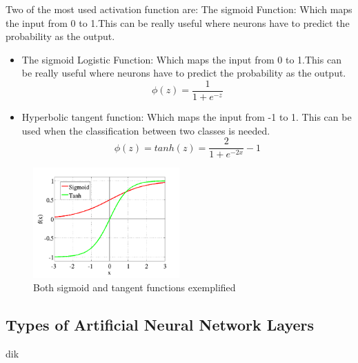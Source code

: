 Two of the most used activation function are:
The sigmoid Function: Which maps the input from 0 to 1.This can be really useful where neurons have to predict the probability as the output.

\begin{itemize}
\item The sigmoid Logistic Function: Which maps the input from 0 to 1.This can be really useful where neurons have to predict the probability as the output.
\begin{equation}
 \phi(z) = \frac{1}{1+e^{-z}}
\end{equation}

\item Hyperbolic tangent function: Which maps the input from -1 to 1. This can be used when the classification between two classes is needed.
\begin{equation}
 \phi(z) = tanh(z)= \frac{2}{1+e^{-2x}}-1
\end{equation}

\end{itemize}

\begin{figure}[htp]
	\centering
	\includegraphics[width=0.5\textwidth]{Illustrations/sigmoidandtangent.jpeg}
	\caption{Both sigmoid and tangent functions exemplified}
	\label{fig:SigmoidAndTangent}
\end{figure}

\subsection{Types of Artificial Neural Network Layers}

dik